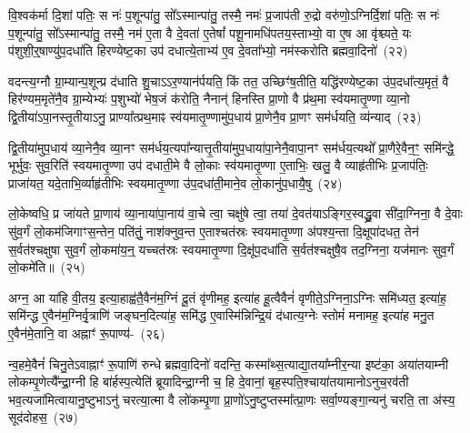 {\anuvakamend[{ओष॑धयः॒ कञ्जु॑होति स्वप॒त्याया॒ष्टाद॑श च}]}

वि॒श्वक॑र्मा दि॒शां पतिः॒ स नः॑ प॒शून्पा॑तु॒ सो᳚\-ऽस्मान्पा॑तु॒ तस्मै॒ नमः॑ प्र॒जा\-प॑ती रु॒द्रो वरु॑णो॒\-ऽग्निर्दि॒शां पतिः॒ स नः॑ प॒शून्पा॑तु॒ सो᳚\-ऽस्मान्पा॑तु॒ तस्मै॒ नम॑ ए॒ता वै दे॒वता॑ ए॒तेषां᳚ पशू॒नामधि॑पतय॒स्ताभ्यो॒ वा ए॒ष आ वृ॑श्च्यते॒ यः प॑शुशी॒र्॒\mbox{}षाण्यु॑प॒\-दधा॑ति हिरण्येष्ट॒का उप॑ दधात्ये॒ताभ्य॑ ए॒व दे॒वता᳚भ्यो॒ नम॑स्करोति ब्रह्मवा॒दिनो॑~(२२)\ip

वदन्त्य॒ग्नौ ग्रा॒म्यान्प॒शून्प्र द॑धाति शु॒चा\-ऽऽर॒ण्यान॑र्पयति॒ किं तत॒ उच्छिꣳ॑ष॒तीति॒ यद्धि॑रण्येष्ट॒का उ॑प॒दधा᳚त्य॒मृतं॒ वै हिर॑ण्यम॒मृते॑नै॒व ग्रा॒म्येभ्यः॑ प॒शुभ्यो॑ भेष॒जं क॑रोति॒ नैनान्॑ हिनस्ति प्रा॒णो वै प्र॑थ॒मा स्व॑यमातृ॒ण्णा व्या॒नो द्वि॒तीया॑\-ऽपा॒नस्तृ॒तीया\-ऽनु॒ प्राण्या᳚त्प्रथ॒माꣴ स्व॑यमातृ॒ण्णामु॑प॒धाय॑ प्रा॒णेनै॒व प्रा॒णꣳ सम॑र्धयति॒ व्य॑न्याद्~(२३)\ip

द्वि॒तीया॑मुप॒धाय॑ व्या॒नेनै॒व व्या॒नꣳ सम॑र्धय॒त्यपा᳚न्यात्तृ॒तीया॑मुप॒धाया॑पा॒नेनै॒वापा॒नꣳ सम॑र्धय॒त्यथो᳚ प्रा॒णैरे॒वैन॒ꣳ॒ समि॑न्द्धे॒ भूर्भुवः॒ सुव॒रिति॑ स्वयमा\-तृ॒ण्णा उप॑ दधाती॒मे वै लो॒काः स्व॑यमातृ॒ण्णा ए॒ताभिः॒ खलु॒ वै व्याहृ॑तीभिः प्र॒जा\-प॑तिः॒ प्राजा॑यत॒ यदे॒ताभि॒र्व्याहृ॑तीभिः स्वयमा\-तृ॒ण्णा उ॑प॒\-दधा॑ती॒माने॒व लो॒कानु॑प॒धायै॒षु~(२४)\ip

लो॒केष्वधि॒ प्र जा॑यते प्रा॒णाय॑ व्या॒नाया॑पा॒नाय॑ वा॒चे त्वा॒ चक्षु॑षे त्वा॒ तया॑ दे॒वत॑या\-ऽ\-ङ्गिर॒स्वद्ध्रु॒वा सी॑दा॒ग्निना॒ वै दे॒वाः सु॑व॒र्गं लो॒कम॑जिगाꣳस॒न्तेन॒ पति॑तुं॒ नाश॑क्नुव॒न्त ए॒ताश्चत॑स्रः स्वयमा\-तृ॒ण्णा अ॑पश्य॒न्ता दि॒क्षूपा॑दधत॒ तेन॑ स॒र्वत॑श्चक्षुषा सुव॒र्गं लो॒कमा॑य॒न्॒ यच्चत॑स्रः स्वयमा\-तृ॒ण्णा दि॒क्षू॑प॒\-दधा॑ति स॒र्वत॑श्चक्षुषै॒व तद॒ग्निना॒ यज॑मानः सुव॒र्गं लो॒कमे॑ति॥~(२५)\ip

{\anuvakamend[{ब्र॒ह्म॒वा॒दिनो॒ व्य॑न्यादे॒षु यज॑मान॒स्त्रीणि॑ च}]}

अग्न॒ आ या॑हि वी॒तय॒ इत्या॒हाह्व॑तै॒वैन॑म॒ग्निं दू॒तं वृ॑णीमह॒ इत्या॑ह हू॒त्वैवैनं॑ वृणीते॒\-ऽग्निना॒\-ऽग्निः समि॑ध्यत॒ इत्या॑ह॒ समि॑न्द्ध ए॒वैन॑म॒ग्निर्वृ॒त्राणि॑ जङ्घन॒दित्या॑ह॒ समि॑द्ध ए॒वास्मि॑न्निन्द्रि॒यं द॑धात्य॒ग्नेः स्तोमं॑ मनामह॒ इत्या॑ह मनु॒त ए॒वैन॑मे॒तानि॒ वा अह्नाꣳ॑ रू॒पाण्य॑-~(२६)\ip

न्व॒हमे॒वैनं॑ चिनु॒ते\-ऽवाह्नाꣳ॑ रू॒पाणि॑ रुन्धे ब्रह्मवा॒दिनो॑ वदन्ति॒ कस्मा᳚थ्स॒त्याद्या॒त\-या᳚म्नीर॒न्या इष्ट॑का॒ अया॑तयाम्नी लोकम्पृ॒णेत्यै᳚न्द्रा॒ग्नी हि बा॑र्\mbox{}हस्प॒त्येति॑ ब्रूयादिन्द्रा॒ग्नी च॒ हि दे॒वानां॒ बृह॒स्पति॒श्चाया॑तयामानो\-ऽनुच॒रव॑ती भव॒त्यजा॑मित्वायानु॒ष्टुभा\-ऽनु॑ चरत्या॒त्मा वै लो॑कम्पृ॒णा प्रा॒णो॑\-ऽनु॒ष्टुप्तस्मा᳚त्प्रा॒णः सर्वा॒ण्यङ्गा॒न्यनु॑ चरति॒ ता अ॑स्य॒ सूद॑दोहस॒~(२७)\ip

